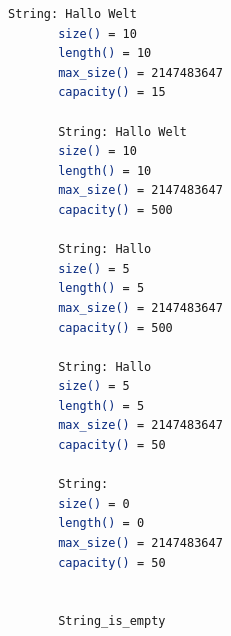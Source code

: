 \documentclass[MES,Master,ngerman]{twbook}%
\begin{document}
\begin{figure}[!htb]
	\begin{subfigure}[b]{0.65\textwidth}
		
		\label{lst:11}
	\end{subfigure}
	\begin{subfigure}[b]{0.35\textwidth}
		\begin{lstlisting}[gobble=6, title={Ausgabe Quellcode (22)}, language=bash, numbers=none]
	   String: Hallo Welt                                                              
	   size() = 10                                                                     
	   length() = 10                                                                   
	   max_size() = 2147483647                                                         
	   capacity() = 15                                                                 
	                                                          
	   String: Hallo Welt                                                              
	   size() = 10                                                                     
	   length() = 10                                                                   
	   max_size() = 2147483647                                                         
	   capacity() = 500                                                                
	   
	   String: Hallo                                                                   
	   size() = 5                                                                      
	   length() = 5                                                                    
	   max_size() = 2147483647                                                         
	   capacity() = 500                                                                
	                                                                    
	   String: Hallo                                                                   
	   size() = 5                                                                      
	   length() = 5                                                                    
	   max_size() = 2147483647                                                         
	   capacity() = 50                                                                 
	   
	   String:                                                                         
	   size() = 0                                                                      
	   length() = 0                                                                    
	   max_size() = 2147483647                                                         
	   capacity() = 50
	   
	   
	   String_is_empty            
                               
                               
                                          	
		\end{lstlisting}
	\end{subfigure}
\end{figure}
\end{document}
